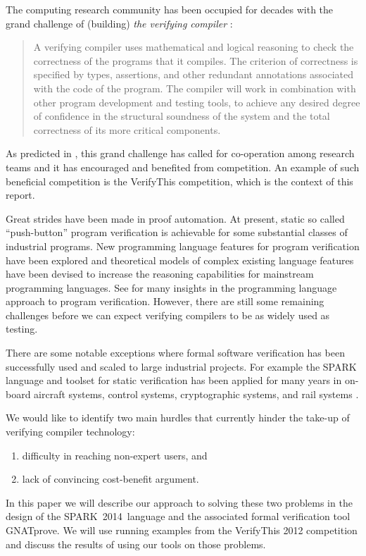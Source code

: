 \documentclass[sttt,final]{svjour}
\newcommand{\gnatprove}{GNATprove\xspace}
\newcommand{\newspark}{SPARK~2014\xspace}
\begin{document}
The computing research community has been occupied for decades with
the grand challenge of (building) \emph{the verifying compiler}
\cite{Hoare03theverifying}:
%
\begin{quote} A verifying compiler uses mathematical and logical reasoning
  to check the correctness of the programs that it compiles. The
  criterion of correctness is specified by types, assertions, and
  other redundant annotations associated with the code of the
  program. The compiler will work in combination with other program
  development and testing tools, to achieve any desired degree of
  confidence in the structural soundness of the system and the total
  correctness of its more critical components.
\end{quote}

As predicted in \cite{Hoare03theverifying}, this grand challenge has
called for co-operation among research teams and it has encouraged
and benefited from competition. An example of such beneficial
competition is the VerifyThis competition, which is the context of
this report.

Great strides have been made in proof automation. At present, static
so called ``push-button'' program verification is achievable for some
substantial classes of industrial programs. New programming language
features for program verification have been explored and theoretical
models of complex existing language features have been devised to
increase the reasoning capabilities for mainstream programming
languages. See \cite{HatcliffLLMP12} for many insights in the
programming language approach to program verification. However, there
are still some remaining challenges before we can expect verifying
compilers to be as widely used as testing.

There are some notable exceptions where formal software verification
has been successfully used and scaled to large industrial
projects. For example the SPARK language and toolset for static
verification has been applied for many years in on-board aircraft
systems, control systems, cryptographic systems, and rail systems
\cite{sparkbook2012,oneill2012}.

We would like to identify two main hurdles that currently hinder the
take-up of verifying compiler technology:
%
\begin{enumerate}
\item difficulty in reaching non-expert users, and
\item lack of convincing cost-benefit argument.
\end{enumerate}
%
In this paper we will describe our approach to solving these two
problems in the design of the \newspark\ language and the associated
formal verification tool \gnatprove. We will use running examples from
the VerifyThis 2012 competition and discuss the results of using our
tools on those problems.
\end{document}
